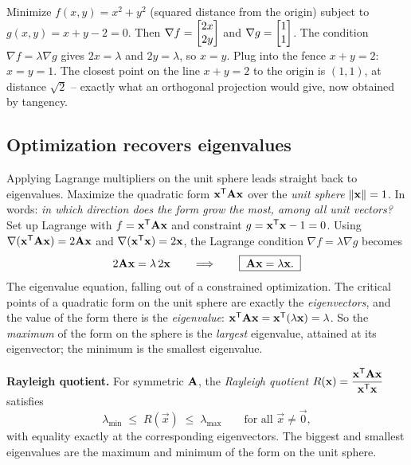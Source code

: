 \begin{example}
\label{ch36:ex-lagrange-line}
Minimize $f(x,y)=x^2+y^2$ (squared distance from the origin) subject to
$g(x,y)=x+y-2=0$. Then $\nabla f=\begin{bmatrix}2x\\2y\end{bmatrix}$ and $\nabla g=\begin{bmatrix}1\\1\end{bmatrix}$. The
condition $\nabla f=\lambda\nabla g$ gives $2x=\lambda$ and $2y=\lambda$, so $x=y$.
Plug into the fence $x+y=2$: $x=y=1$. The closest point on the line $x+y=2$ to the
origin is $(1,1)$, at distance $\sqrt2$ -- exactly what an orthogonal projection
would give, now obtained by tangency.
\end{example}

\subsection{Optimization recovers eigenvalues}

Applying Lagrange multipliers on the unit sphere leads straight back to
eigenvalues. Maximize the quadratic form
$\mathbf{x}^{\mathsf{T}}\mathbf{A}\mathbf{x}$ over the \emph{unit sphere} $\lVert\mathbf{x}\rVert=1$. In words:
\emph{in which direction does the form grow the most, among all unit vectors?} Set up
Lagrange with $f=\mathbf{x}^{\mathsf{T}}\mathbf{A}\mathbf{x}$ and constraint $g=\mathbf{x}^{\mathsf{T}}\mathbf{x}-1=0$. Using
$\nabla(\mathbf{x}^{\mathsf{T}}\mathbf{A}\mathbf{x})=2\mathbf{A}\mathbf{x}$ and $\nabla(\mathbf{x}^{\mathsf{T}}\mathbf{x})=2\mathbf{x}$,
the Lagrange condition $\nabla f=\lambda\nabla g$ becomes
\[
  2\mathbf{A}\mathbf{x}=\lambda\,2\mathbf{x}
  \qquad\Longrightarrow\qquad \boxed{\;\mathbf{A}\mathbf{x}=\lambda\mathbf{x}.\;}
\]
The eigenvalue equation, falling out of a constrained optimization. The critical
points of a quadratic form on the unit sphere are exactly the \emph{eigenvectors}, and
the value of the form there is the \emph{eigenvalue}: $\mathbf{x}^{\mathsf{T}}\mathbf{A}\mathbf{x}=
\mathbf{x}^{\mathsf{T}}(\lambda\mathbf{x})=\lambda$. So the \emph{maximum} of the form on the sphere is
the \emph{largest} eigenvalue, attained at its eigenvector; the minimum is the
smallest eigenvalue.

\begin{formalbox}
\label{ch36:thm-rayleigh}
\textbf{Rayleigh quotient.} For symmetric $\mathbf{A}$, the \emph{Rayleigh quotient}
$R(\mathbf{x})=\dfrac{\mathbf{x}^{\mathsf{T}}\mathbf{A}\mathbf{x}}{\mathbf{x}^{\mathsf{T}}\mathbf{x}}$ satisfies
\[
  \lambda_{\min} \;\le\; R(\vec{x}) \;\le\; \lambda_{\max} \qquad\text{for all }\vec{x}\ne\vec0,
\]
with equality exactly at the corresponding eigenvectors. The biggest and smallest
eigenvalues are the maximum and minimum of the form on the unit sphere.
\end{formalbox}

